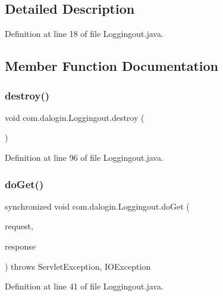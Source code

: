\subsection{Detailed Description}


Definition at line 18 of file Loggingout.\+java.



\subsection{Member Function Documentation}
\mbox{\label{classcom_1_1dalogin_1_1_loggingout_a4d14146520d207a39b32b09ca6f346ee}} 
\subsubsection{\texorpdfstring{destroy()}{destroy()}}
{\footnotesize\ttfamily void com.\+dalogin.\+Loggingout.\+destroy (\begin{DoxyParamCaption}{ }\end{DoxyParamCaption})}



Definition at line 96 of file Loggingout.\+java.

\mbox{\label{classcom_1_1dalogin_1_1_loggingout_a53a1ba0e21d298c5d1cc4a0bbed4d575}} 
\subsubsection{\texorpdfstring{do\+Get()}{doGet()}}
{\footnotesize\ttfamily synchronized void com.\+dalogin.\+Loggingout.\+do\+Get (\begin{DoxyParamCaption}\item[{Http\+Servlet\+Request}]{request,  }\item[{Http\+Servlet\+Response}]{response }\end{DoxyParamCaption}) throws Servlet\+Exception, I\+O\+Exception}



Definition at line 41 of file Loggingout.\+java.

